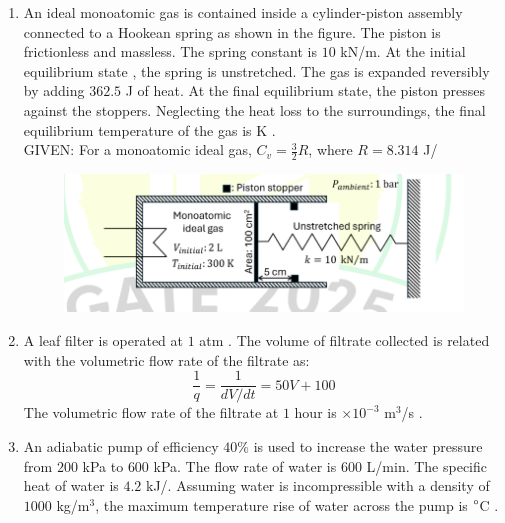 \documentclass[journal,12pt,onecolumn]{IEEEtran}
\theoremstyle{remark}
\begin{document}
\begin{enumerate}
		\item An ideal monoatomic gas is contained inside a cylinder-piston assembly connected to a Hookean spring as shown in the figure. The piston is frictionless and massless. The spring constant is $10$ kN/m. At the initial equilibrium state , the spring is unstretched. The gas is expanded reversibly by adding $362.5$ J of heat. At the final equilibrium state, the piston presses against the stoppers. Neglecting the heat loss to the surroundings, the final equilibrium temperature of the gas is \underline{\hspace{2cm}} K . \\
		GIVEN: For a monoatomic ideal gas, $C_v = \frac{3}{2}R$, where $R = 8.314$ J/
		\begin{figure}[h]
			\centering
			\includegraphics[width=0.7\columnwidth]{q48.png}
			\caption*{}
			\label{fig:q48}
		\end{figure}
		
		\hfill{}
		
		\item A leaf filter is operated at $1$ atm . The volume of filtrate collected  is related with the volumetric flow rate of the filtrate  as:
		\[ \frac{1}{q} = \frac{1}{dV/dt} = 50 V + 100 \]
		The volumetric flow rate of the filtrate at $1$ hour is \underline{\hspace{2cm}} $\times 10^{-3}$ m$^3$/s .
		
		\hfill{}
		
		\item An adiabatic pump of efficiency $40\%$ is used to increase the water pressure from $200$ kPa to $600$ kPa. The flow rate of water is $600$ L/min. The specific heat of water is $4.2$ kJ/. Assuming water is incompressible with a density of $1000$ kg/m$^3$, the maximum temperature rise of water across the pump is \underline{\hspace{2cm}}$\degree$C .
		

\end{enumerate}
\end{document}
